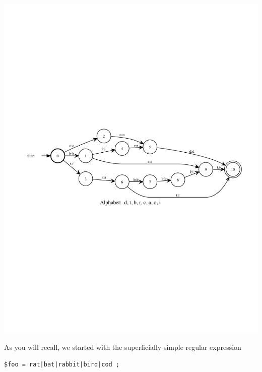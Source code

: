 \begin{center}
\includegraphics[width=135mm]{images/minimized.pdf}
\end{center}

As you will recall, we started with the superficially simple regular
expression


\begin{Verbatim}
$foo = rat|bat|rabbit|bird|cod ;
\end{Verbatim}

